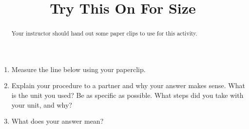 \documentclass[nooutcomes,noauthor, handout]{ximera}
\title{Try This On For Size}
\begin{document}
\begin{abstract}
Your instructor should hand out some paper clips to use for this activity.
\end{abstract}
\maketitle

\begin{problem}
\begin{enumerate}
\item Measure the line below using your paperclip. 
\item Explain your procedure to a partner and why your answer makes sense. What is the unit you used? Be as specific as possible. What steps did you take with your unit, and why?
\item What does your answer mean?
\end{enumerate}
\begin{center}
\end{center}
\end{problem}

\vfill
\end{document}
